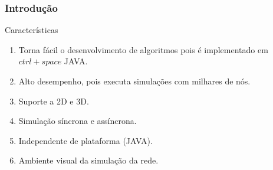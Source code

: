 \documentclass{beamer}
\begin{document}

\begin{frame}\frametitle{Introdução}

\begin{block}{Características}
	\begin{enumerate}
		\item Torna fácil o desenvolvimento de algoritmos pois é implementado em \sout{$ctrl+space$} JAVA.
		\item Alto desempenho, pois executa simulações com milhares de nós.
		\item Suporte a 2D e 3D.
		\item Simulação síncrona e assíncrona.
		\item Independente de plataforma (JAVA).
		\item Ambiente visual da simulação da rede.		
	\end{enumerate}
\end{block}


\begin{figure}[h]

\centering
{}
\;
\;
\;

\end{figure}
\end{frame}
\end{document}
